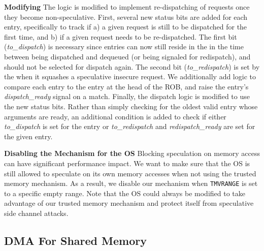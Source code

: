 \textbf{Modifying \MemRS{}}
The \MemRS{} logic is modified to implement re-dispatching of requests once they become non-speculative.
First, several new status bits are added for each \MemRS{} entry, specifically to track if a) a given request is still to be dispatched for the first time, and b) if a given request needs to be re-dispatched. 
The first bit (\textit{to\_dispatch}) is necessary since entries can now still reside in the \MemRS{} in the time between being dispatched and dequeued (or being signaled for redispatch), and should not be selected for dispatch again.
The second bit (\textit{to\_redispatch}) is set by the \MemExePipeline{} when it squashes a speculative insecure request. 
We additionally add logic to compare each \MemRS{} entry to the entry at the head of the ROB, and raise the entry's \textit{dispatch\_ready} signal on a match.
Finally, the dispatch logic is modified to use the new status bits. Rather than simply checking for the oldest valid entry whose arguments are ready, an additional condition is added to check if either \textit{to\_dispatch} is set for the entry or \textit{to\_redispatch} and \textit{redispatch\_ready} are set for the given entry.

\textbf{Disabling the Mechanism for the OS}
Blocking speculation on memory access can have significant performance impact.
We want to make sure that the OS is still allowed to speculate on its own memory accesses when not using the trusted memory mechanism.
As a result, we disable our mechanism when \texttt{TMVRANGE} is set to a specific empty range.
Note that the OS could always be modified to take advantage of our trusted memory mechanism and protect itself from speculative side channel attacks.

\subsection{DMA For Shared Memory}

